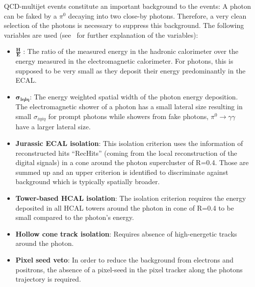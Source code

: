 QCD-multijet events constitute an important background to the \GAMJET events: A photon can be faked by a $\pi^{0}$ decaying into two close-by photons. 
Therefore, a very clean selection of the photons is necessary to suppress this background.
The following variables are used (see~\cite{CMS-PAS-EGM-10-006} for further explanation of the variables):

\begin{itemize}
 \item $\frac{\textbf{H}}{\textbf{E}}$ : The ratio of the measured energy in the hadronic calorimeter over the energy measured in the electromagnetic calorimeter. 
                                                    For photons, this is supposed to be very small as they deposit their energy predominantly in the ECAL.
 \item $\mathbold{\sigma_{i\eta i \eta}}$: The energy weighted spatial width of the photon energy deposition. The electromagnetic shower of a photon has a small lateral size 
                                           resulting in small $\sigma_{i\eta i \eta}$ for prompt photons while showers from fake photons, \eg $\pi^{0} \rightarrow \gamma \gamma$
                                           have a larger lateral size.
 \item \textbf{Jurassic ECAL isolation}: This isolation criterion uses the information of reconstructed hits ``RecHits'' (coming from the local reconstruction of the digital signals) 
                                         in a cone around the photon supercluster of R=0.4. Those are summed up and an upper criterion is identified to discriminate against 
                                         background which is typically spatially broader.  
 \item \textbf{Tower-based HCAL isolation}: The isolation criterion requires the energy deposited in all HCAL towers around the photon in cone of R=0.4 to be small compared to the 
                                            photon's energy. 
 \item \textbf{Hollow cone track isolation}: Requires absence of high-energetic tracks around the photon.
 \item \textbf{Pixel seed veto}: In order to reduce the background from electrons and positrons, the absence of a pixel-seed in the pixel tracker along the photons 
                                 trajectory is required.
\end{itemize}

